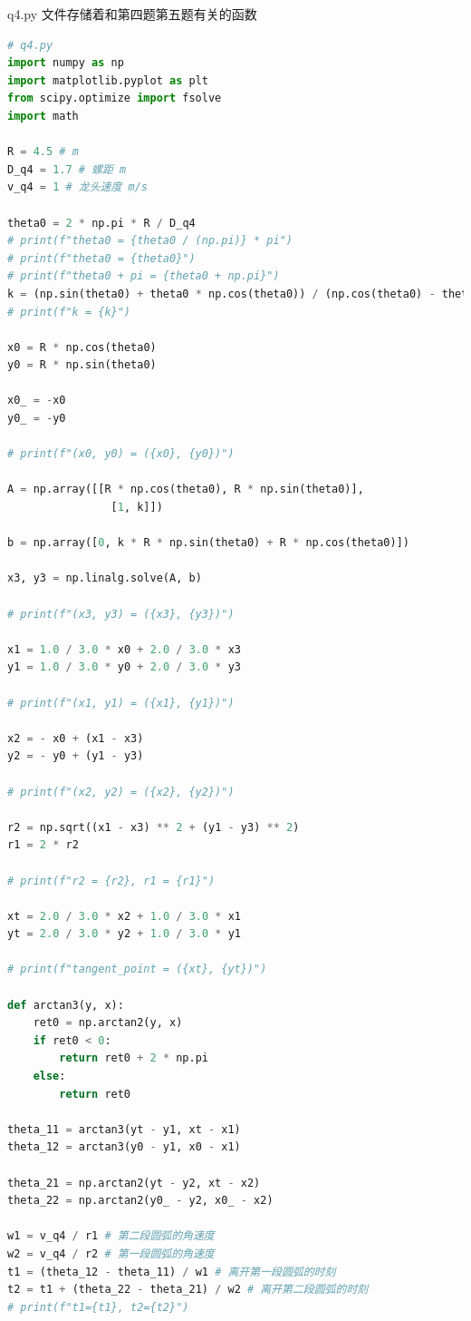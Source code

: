\documentclass[a4paper]{article}
\begin{document}
	q4.py 文件存储着和第四题第五题有关的函数
	\begin{lstlisting}[language=python,columns=fullflexible,frame=shadowbox]
# q4.py
import numpy as np
import matplotlib.pyplot as plt
from scipy.optimize import fsolve
import math

R = 4.5 # m
D_q4 = 1.7 # 螺距 m
v_q4 = 1 # 龙头速度 m/s

theta0 = 2 * np.pi * R / D_q4
# print(f"theta0 = {theta0 / (np.pi)} * pi")
# print(f"theta0 = {theta0}")
# print(f"theta0 + pi = {theta0 + np.pi}")
k = (np.sin(theta0) + theta0 * np.cos(theta0)) / (np.cos(theta0) - theta0 * np.sin(theta0))
# print(f"k = {k}")

x0 = R * np.cos(theta0)
y0 = R * np.sin(theta0)

x0_ = -x0
y0_ = -y0

# print(f"(x0, y0) = ({x0}, {y0})")

A = np.array([[R * np.cos(theta0), R * np.sin(theta0)],
				[1, k]])

b = np.array([0, k * R * np.sin(theta0) + R * np.cos(theta0)])

x3, y3 = np.linalg.solve(A, b)

# print(f"(x3, y3) = ({x3}, {y3})")

x1 = 1.0 / 3.0 * x0 + 2.0 / 3.0 * x3
y1 = 1.0 / 3.0 * y0 + 2.0 / 3.0 * y3

# print(f"(x1, y1) = ({x1}, {y1})")

x2 = - x0 + (x1 - x3)
y2 = - y0 + (y1 - y3)

# print(f"(x2, y2) = ({x2}, {y2})")

r2 = np.sqrt((x1 - x3) ** 2 + (y1 - y3) ** 2)
r1 = 2 * r2

# print(f"r2 = {r2}, r1 = {r1}")

xt = 2.0 / 3.0 * x2 + 1.0 / 3.0 * x1
yt = 2.0 / 3.0 * y2 + 1.0 / 3.0 * y1

# print(f"tangent_point = ({xt}, {yt})")

def arctan3(y, x):
	ret0 = np.arctan2(y, x)
	if ret0 < 0:
		return ret0 + 2 * np.pi
	else:
		return ret0

theta_11 = arctan3(yt - y1, xt - x1)
theta_12 = arctan3(y0 - y1, x0 - x1)
	
theta_21 = np.arctan2(yt - y2, xt - x2)
theta_22 = np.arctan2(y0_ - y2, x0_ - x2)

w1 = v_q4 / r1 # 第二段圆弧的角速度
w2 = v_q4 / r2 # 第一段圆弧的角速度
t1 = (theta_12 - theta_11) / w1 # 离开第一段圆弧的时刻
t2 = t1 + (theta_22 - theta_21) / w2 # 离开第二段圆弧的时刻
# print(f"t1={t1}, t2={t2}")


\end{lstlisting}
\end{document}
